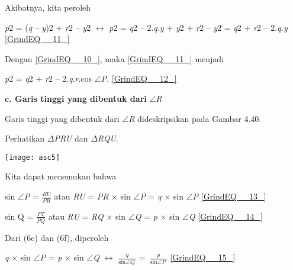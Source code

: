 \documentclass[11pt,fleqn]{book} %
\begin{document}
\begin{myEnumerate}
\begin{itemize}
\noindent 

\noindent Akibatnya, kita peroleh

\noindent \textit{}

\noindent \textit{p}2 = (\textit{q }-- \textit{y})2 + \textit{r}2 -- \textit{y}2 $\mathrm{\leftrightarrow}$ \textit{p}2 = \textit{q}2 -- 2.\textit{q.y }+ \textit{y}2 + \textit{r}2 -- \textit{y}2 = \textit{q}2 + \textit{r}2 -- 2.\textit{q.y   }\eqref{GrindEQ__11_}

\noindent 

\noindent \eject 

\noindent Dengan \eqref{GrindEQ__10_}, maka \eqref{GrindEQ__11_} menjadi

\noindent \textit{}

\noindent \textit{p}2 = \textit{q}2 + \textit{r}2 -- 2.\textit{q}.\textit{r}.cos $\mathrm{\angle }$\textit{P}.         \eqref{GrindEQ__12_}

\noindent 

\noindent \textbf{c. Garis tinggi yang dibentuk dari }$\mathrm{\angle }$\textit{R}

Garis tinggi yang dibentuk dari $\mathrm{\angle }$\textit{R }dideskripsikan pada Gambar 4.40.\textit{}

Perhatikan $\Delta$\textit{PRU }dan $\Delta$\textit{RQU}.



\noindent \texttt{[image: asc5]}

\noindent Kita dapat menemukan bahwa

\noindent 

\noindent sin $\mathrm{\angle }$\textit{P }=  $\frac{RU}{PR}$\textit{ }atau \textit{RU }= \textit{PR }$\times$ sin $\mathrm{\angle }$\textit{P }= \textit{q }$\times$ sin $\mathrm{\angle }$\textit{P      }\eqref{GrindEQ__13_}\textit{}

\noindent sin Q =  $\frac{PT}{PQ}$\textit{ }atau \textit{RU }= \textit{RQ }$\times$ sin $\mathrm{\angle }$\textit{Q }= \textit{p }$\times$ sin $\mathrm{\angle }$\textit{Q      }\eqref{GrindEQ__14_}

\noindent 

\noindent Dari (6e) dan (6f), diperoleh\textit{}

\noindent \textit{}

\noindent \textit{q }$\times$ sin $\mathrm{\angle }$\textit{P }= \textit{p }$\times$ sin $\mathrm{\angle }$\textit{Q }$\mathrm{\leftrightarrow}$ $\frac{q}{{\mathrm{sin} \mathrm{\angle }Q\ }}=\ \frac{p}{{\mathrm{sin} \mathrm{\angle }P\ }}$      \eqref{GrindEQ__15_}


\end{itemize}
\end{myEnumerate}
\end{document}

